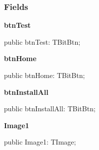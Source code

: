\documentclass{report}
\newif\ifpdf
\begin{document}
\subsubsection*{\large{\textbf{Fields}}\normalsize\hspace{1ex}\hfill}
\begin{list}{}{
\setlength{\itemindent}{0cm}
\setlength{\listparindent}{0cm}
\setlength{\leftmargin}{\evensidemargin}
\addtolength{\leftmargin}{\tmplength}
\settowidth{\labelsep}{X}
\addtolength{\leftmargin}{\labelsep}
\setlength{\labelwidth}{\tmplength}
}
\label{xtypefm.TimdFrm-btnTest}
\item[\textbf{btnTest}\hfill]
\ifpdf
\begin{flushleft}
\fi
\begin{ttfamily}
public btnTest: TBitBtn;\end{ttfamily}

\ifpdf
\end{flushleft}
\fi


\par  \label{xtypefm.TimdFrm-btnHome}
\item[\textbf{btnHome}\hfill]
\ifpdf
\begin{flushleft}
\fi
\begin{ttfamily}
public btnHome: TBitBtn;\end{ttfamily}

\ifpdf
\end{flushleft}
\fi


\par  \label{xtypefm.TimdFrm-btnInstallAll}
\item[\textbf{btnInstallAll}\hfill]
\ifpdf
\begin{flushleft}
\fi
\begin{ttfamily}
public btnInstallAll: TBitBtn;\end{ttfamily}

\ifpdf
\end{flushleft}
\fi


\par  \label{xtypefm.TimdFrm-Image1}
\item[\textbf{Image1}\hfill]
\ifpdf
\begin{flushleft}
\fi
\begin{ttfamily}
public Image1: TImage;\end{ttfamily}

\ifpdf
\end{flushleft}
\fi



\end{list}
\end{document}
